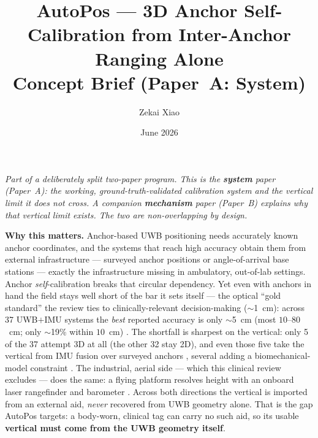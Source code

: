 \documentclass[10pt,a4paper]{article}
\title{\vspace{-1.5em}AutoPos --- 3D Anchor Self-Calibration from Inter-Anchor Ranging Alone\\[3pt]
       \large Concept Brief (Paper~A: System)}
\author{Zekai Xiao}
\date{\vspace{-1em}June 2026}
\begin{document}
\maketitle
\vspace{-1.0em}

\textit{Part of a deliberately split two-paper program. This is the \textbf{system} paper
(Paper~A): the working, ground-truth-validated calibration system and the vertical limit it does
not cross. A companion \textbf{mechanism} paper (Paper~B) explains \emph{why} that vertical limit
exists. The two are non-overlapping by design.}

\textbf{Why this matters.} Anchor-based UWB positioning needs accurately known anchor coordinates, and
the systems that reach high accuracy obtain them from external infrastructure --- surveyed anchor
positions or angle-of-arrival base stations \citep{zihajehzadeh_2017,kok_2015} --- exactly the infrastructure missing in ambulatory,
out-of-lab settings. Anchor \emph{self}-calibration breaks that circular dependency. Yet even with anchors in hand the
field stays well short of the bar it sets itself --- the optical ``gold standard'' the review ties to
clinically-relevant decision-making ($\sim$1~cm): across 37 UWB$+$IMU systems the \emph{best} reported
accuracy is only $\sim$5~cm (most $10$--$80$~cm; only $\sim$19\% within $10$~cm)
\citep{yogesh_2023,yogesh_2024}. The shortfall is sharpest on the vertical: only 5 of the 37 attempt 3D at all (the other 32 stay 2D), and even those five take the vertical from
IMU fusion over surveyed anchors \citep{kok_2015}, several adding a biomechanical-model constraint
\citep{zihajehzadeh_2017}. The industrial, aerial side --- which this clinical review excludes --- does
the same: a flying platform resolves height with an onboard laser rangefinder and barometer
\citep{xiang_2025_uav}. Across both directions the vertical is imported from an external aid,
\emph{never} recovered from UWB geometry alone. That is the gap AutoPos targets: a body-worn, clinical
tag can carry no such aid, so its usable \textbf{vertical must come from the UWB geometry itself}.
\end{document}
